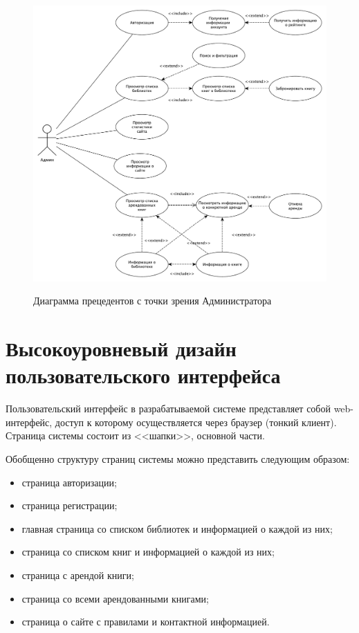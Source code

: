 \begin{figure}[H]
	\begin{center}
		{\includegraphics[scale = 0.4]{../img/use-case/admin.pdf}}
		\caption{Диаграмма прецедентов с точки зрения Администратора}
		\label{fig:use-case-admin}
	\end{center}
\end{figure}


\section{Высокоуровневый дизайн пользовательского интерфейса}

Пользовательский интерфейс в разрабатываемой системе представляет собой web-интерфейс, доступ к которому осуществляется через браузер (тонкий клиент). Страница системы состоит из <<шапки>>, основной части.  

Обобщенно структуру страниц системы можно представить следующим образом:
\begin{itemize}
  \item страница авторизации;
	\item страница регистрации;
	\item главная страница со списком библиотек и информацией о каждой из них;
	\item страница со списком книг и информацией о каждой из них;
	\item страница с арендой книги;
	\item страница со всеми арендованными книгами;
	\item страница о сайте с правилами и контактной информацией.
\end{itemize}

